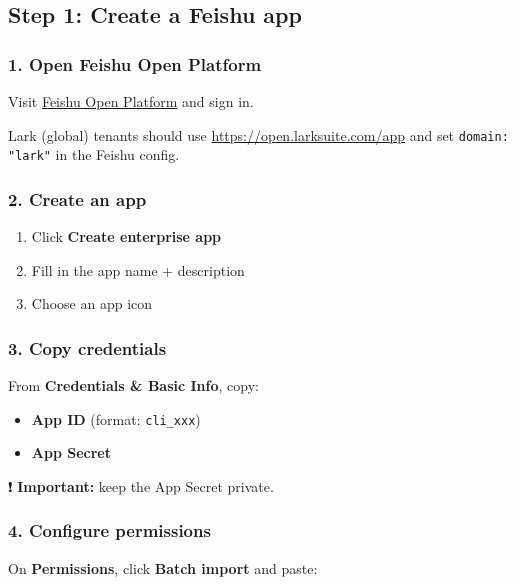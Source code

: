 \hrulefill


\subsection{Step 1: Create a Feishu app}


\subsubsection{1. Open Feishu Open Platform}


Visit \href{https://open.feishu.cn/app}{Feishu Open Platform} and sign in.

Lark (global) tenants should use \href{https://open.larksuite.com/app}{https://open.larksuite.com/app} and set \texttt{domain: "lark"} in the Feishu config.

\subsubsection{2. Create an app}


\begin{enumerate}
  \item Click \textbf{Create enterprise app}
  \item Fill in the app name + description
  \item Choose an app icon
\end{enumerate}



\subsubsection{3. Copy credentials}


From \textbf{Credentials \& Basic Info}, copy:

\begin{itemize}
  \item \textbf{App ID} (format: \texttt{cli\_xxx})
  \item \textbf{App Secret}
\end{itemize}


❗ \textbf{Important:} keep the App Secret private.


\subsubsection{4. Configure permissions}


On \textbf{Permissions}, click \textbf{Batch import} and paste:

